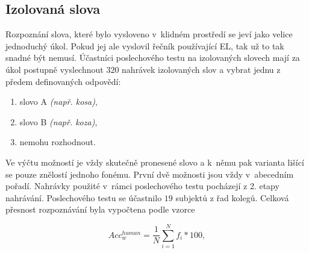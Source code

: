 \subsection{Izolovaná slova}
\label{chap:realisation:listening:isolated}

Rozpoznání slova, které bylo vysloveno v~klidném prostředí se jeví jako velice jednoduchý úkol.
Pokud jej ale vyslovil řečník používající EL, tak už to tak snadné být nemusí.
Účastníci poslechového testu na izolovaných slovech mají za úkol postupně vyslechnout $320$ nahrávek izolovaných slov a vybrat jednu z předem definovaných odpovědí:

\begin{enumerate}[label=\alph*)]
  \item slovo A \textit{(např. kosa)},
  \item slovo B \textit{(např. koza)},
  \item nemohu rozhodnout.
\end{enumerate}

\noindent Ve výčtu možností je vždy skutečně pronesené slovo a  k~němu pak varianta lišící se pouze znělostí jednoho fonému. První dvě možnosti jsou vždy v~abecedním pořadí. Nahrávky použité v~rámci poslechového testu pocházejí z 2. etapy nahrávání. Poslechového testu se účastnilo $19$ subjektů z řad kolegů.
Celková přesnost rozpoznávání byla vypočtena podle vzorce

\begin{equation}
  Acc_w^{human} = \frac{1}{N} \sum_{i=1}^{N} f_i * 100,
  \label{eq:realisation:accuracy:human}
\end{equation}

